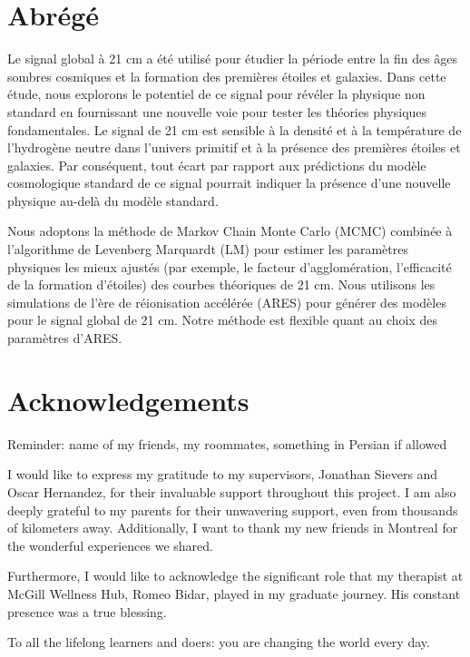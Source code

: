 \documentclass[12pt, TexShade, letterpaper]{report}
\begin{document}
\chapter*{Abrégé}
	\label{chap:frAbstract}
Le signal global à 21 cm a été utilisé pour étudier la période entre la fin des âges sombres cosmiques et la formation des premières étoiles et galaxies. \Par
Dans cette étude, nous explorons le potentiel de ce signal pour révéler la physique non standard en fournissant une nouvelle voie pour tester les théories physiques fondamentales. Le signal de 21 cm est sensible à la densité et à la température de l'hydrogène neutre dans l'univers primitif et à la présence des premières étoiles et galaxies. Par conséquent, tout écart par rapport aux prédictions du modèle cosmologique standard de ce signal pourrait indiquer la présence d'une nouvelle physique au-delà du modèle standard.\par
Nous adoptons la méthode de Markov Chain Monte Carlo (MCMC) combinée à l'algorithme de Levenberg Marquardt (LM) pour estimer les paramètres physiques les mieux ajustés (par exemple, le facteur d'agglomération, l'efficacité de la formation d'étoiles) des courbes théoriques de 21 cm. Nous utilisons les simulations de l'ère de réionisation accélérée (ARES) pour générer des modèles pour le signal global de 21 cm. Notre méthode est flexible quant au choix des paramètres d'ARES.\par

\chapter*{Acknowledgements}
	\label{chap:acknowledgments}


Reminder: name of my friends, my roommates, something in Persian if allowed \par 
I would like to express my gratitude to my supervisors, Jonathan Sievers and Oscar Hernandez, for their invaluable support throughout this project. I am also deeply grateful to my parents for their unwavering support, even from thousands of kilometers away. Additionally, I want to thank my new friends in Montreal for the wonderful experiences we shared.\par
Furthermore, I would like to acknowledge the significant role that my therapist at McGill Wellness Hub, Romeo Bidar, played in my graduate journey. His constant presence was a true blessing.\par
 To all the lifelong learners and doers: you are changing the world every day.
	\tableofcontents\thispagestyle{plain}
\end{document}

